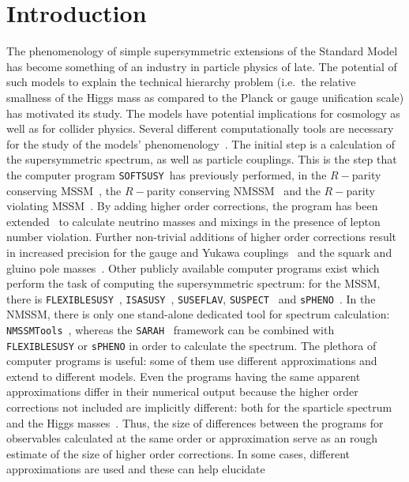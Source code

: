\documentclass[final,3p,times,pdflatex]{elsarticle}
\def\SOFTSUSY{{\tt SOFTSUSY}}
\def\code#1{{\tt #1}}
\begin{document}
\section{Introduction}
The phenomenology of simple supersymmetric extensions of the Standard Model
has become something of an industry in particle physics of late. The potential
of such models to explain the technical hierarchy problem (i.e.\ the relative
smallness of the Higgs mass as compared to the Planck or gauge unification
scale) has motivated its study. The models have potential implications for
cosmology as well as for collider physics. Several different computationally
tools are necessary for the study of the models'
phenomenology~\cite{Allanach:2008zn}. The initial step is a calculation of the
supersymmetric spectrum, as well as particle couplings. This is the step 
that the computer program \SOFTSUSY~has previously performed, in the
$R-$parity conserving MSSM~\cite{Allanach:2001kg}, the $R-$parity conserving
NMSSM~\cite{Allanach:2013kza} and the $R-$parity violating
MSSM~\cite{Allanach:2009bv}. By adding higher order corrections, the program
has been extended~\cite{Allanach:2011de} to calculate neutrino masses and
mixings in the presence of lepton number violation. Further non-trivial
additions of higher order corrections result in increased precision for the
gauge 
and Yukawa couplings~\cite{Allanach:2014nba} and the squark and gluino pole
masses~\cite{Allanach:2016rxd}. Other publicly available computer programs
exist which perform the task of computing the supersymmetric spectrum: for the
MSSM, there is \code{FLEXIBLESUSY}~\cite{Athron:2014yba}, 
\code{ISASUSY}~\cite{Paige:2003mg}, \code{SUSEFLAV},
\code{SUSPECT}~\cite{Djouadi:2002ze}
and \code{sPHENO}~\cite{Porod:2003um}. In the NMSSM, there is only one
stand-alone dedicated tool for spectrum calculation:
\code{NMSSMTools}~\cite{Ellwanger:2004xm,Ellwanger:2006rn}, whereas the
\code{SARAH}~\cite{Staub:2008uz} framework can be combined with
\code{FLEXIBLESUSY} or \code{sPHENO} in order to calculate the spectrum. 
The plethora of computer programs is useful: some of them use different
approximations and extend to different models. Even the programs having the
same apparent approximations differ in their numerical output because the
higher order corrections not included are implicitly different: both for the
sparticle spectrum~\cite{Allanach:2003jw} and the Higgs
masses~\cite{Allanach:2004rh,Staub:2015aea,deFlorian:2016spz}. Thus, the size of
differences between the programs for observables calculated at the same order
or approximation serve as an rough estimate of the size of higher order
corrections. In some cases, different approximations are used and these can
help elucidate 
\end{document}

